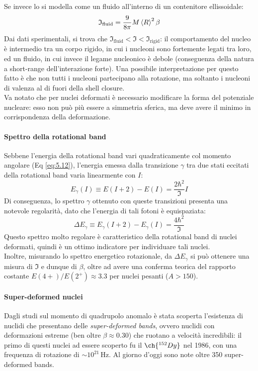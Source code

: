 Se invece lo si modella come un fluido all'interno di un contenitore ellissoidale:
\begin{equation}
	\mathfrak{I}_{\text{fluid}} = \frac{9}{8\pi} M \braket{R}^2 \beta
	\label{eq:5.14}
\end{equation}
Dai dati sperimentali, si trova che $ \mathfrak{I}_{\text{fluid}} < \mathfrak{I} < \mathfrak{I}_{\text{rigid}} $: il comportamento del nucleo è intermedio tra un corpo rigido, in cui i nucleoni sono fortemente legati tra loro, ed un fluido, in cui invece il legame nucleonico è debole (conseguenza della natura a short-range dell'interazione forte). Una possibile interpretazione per questo fatto è che non tutti i nucleoni partecipano alla rotazione, ma soltanto i nucleoni di valenza al di fuori della shell closure.\\
Va notato che per nuclei deformati è necessario modificare la forma del potenziale nucleare: esso non può più essere a simmetria sferica, ma deve avere il minimo in corrispondenza della deformazione.

\paragraph{Spettro della rotational band}

Sebbene l'energia della rotational band vari quadraticamente col momento angolare (Eq \ref{eq:5.12}), l'energia emessa dalla transizione $ \gamma $ tra due stati eccitati della rotational band varia linearmente con $ I $:
\begin{equation}
	E_{\gamma}(I) \equiv E(I + 2) - E(I) = \frac{2\hbar^2}{\mathfrak{I}} I
	\label{eq:5.15}
\end{equation}
Di conseguenza, lo spettro $ \gamma $ ottenuto con queste transizioni presenta una notevole regolarità, dato che l'energia di tali fotoni è equispaziata:
\begin{equation}
	\Delta E_{\gamma} \equiv E_{\gamma}(I + 2) - E_{\gamma}(I) = \frac{4\hbar^2}{\mathfrak{I}}
	\label{eq:5.16}
\end{equation}
Questo spettro molto regolare è caratteristico della rotational band di nuclei deformati, quindi è un ottimo indicatore per individuare tali nuclei.\\
Inoltre, misurando lo spettro energetico rotazionale, da $ \Delta E_{\gamma} $ si può ottenere una misura di $ \mathfrak{I} $ e dunque di $ \beta $, oltre ad avere una conferma teorica del rapporto costante $ E(4+) / E(2^+) \approx 3.3 $ per nuclei pesanti ($ A > 150 $).

\paragraph{Super-deformed nuclei}

Dagli studi sul momento di quadrupolo anomalo è stata scoperta l'esistenza di nuclidi che presentano delle \textit{super-deformed bands}, ovvero nuclidi con deformazioni estreme (ben oltre $ \beta \approx 0.30 $) che ruotano a velocità incredibili: il primo di questi nuclei ad essere scoperto fu il $ \ch{^{152}Dy} $ nel 1986, con una frequenza di rotazione di $ \sim 10^{21} \,\text{Hz} $. Al giorno d'oggi sono note oltre 350 super-deformed bands.

